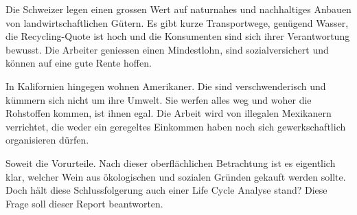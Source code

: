 
Die Schweizer legen einen grossen Wert auf naturnahes und nachhaltiges Anbauen von
landwirtschaftlichen Gütern. Es gibt kurze Transportwege, genügend Wasser, die Recycling-Quote ist
hoch und die Konsumenten sind sich ihrer Verantwortung bewusst. Die Arbeiter geniessen einen
Mindestlohn, sind sozialversichert und können auf eine gute Rente hoffen.

In Kalifornien hingegen wohnen Amerikaner. Die sind verschwenderisch und kümmern sich nicht um ihre
Umwelt. Sie werfen alles weg und woher die Rohstoffen kommen, ist ihnen egal. Die Arbeit wird von
illegalen Mexikanern verrichtet, die weder ein geregeltes Einkommen haben noch sich gewerkschaftlich
organisieren dürfen.

Soweit die Vorurteile. Nach dieser oberflächlichen Betrachtung ist es eigentlich klar, welcher Wein
aus ökologischen und sozialen Gründen gekauft werden sollte. Doch hält diese Schlussfolgerung auch
einer Life Cycle Analyse stand? Diese Frage soll dieser Report beantworten.
